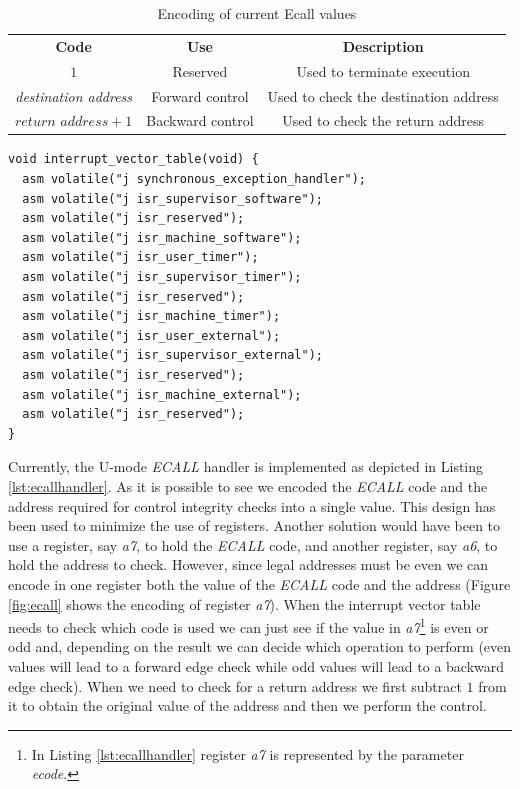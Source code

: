 \begin{table}
  \centering
  \begin{tabular}{|c|c|c|}
    \hline
    \textbf{Code}                & \textbf{Use}     & \textbf{Description}                  \\
    \hhline{===} $1$             & Reserved         & Used to terminate execution           \\
    \hline
    \textit{destination address} & Forward control  & Used to check the destination address \\
    \hline
    $\textit{return address}+ 1$ & Backward control & Used to check the return address      \\
    \hline
  \end{tabular}
  \caption{Encoding of current Ecall values}
  \label{tab:ecalls}
\end{table}

\begin{lstlisting}[style=CStyle, caption = Interrput Vector Table, label={lst:intrtable}]
void interrupt_vector_table(void) {
  asm volatile("j synchronous_exception_handler");
  asm volatile("j isr_supervisor_software");
  asm volatile("j isr_reserved");
  asm volatile("j isr_machine_software");
  asm volatile("j isr_user_timer");
  asm volatile("j isr_supervisor_timer");
  asm volatile("j isr_reserved");
  asm volatile("j isr_machine_timer");
  asm volatile("j isr_user_external");
  asm volatile("j isr_supervisor_external");
  asm volatile("j isr_reserved");
  asm volatile("j isr_machine_external");
  asm volatile("j isr_reserved");
}
\end{lstlisting}

Currently, the U-mode \textit{ECALL} handler is implemented as depicted in
Listing \ref{lst:ecallhandler}. As it is possible to see we encoded the \textit{ECALL}
code and the address required for control integrity checks into a single value. This
design has been used to minimize the use of registers. Another solution would
have been to use a register, say \textit{a7}, to hold the \textit{ECALL} code, and
another register, say \textit{a6}, to hold the address to check. However, since
legal addresses must be even we can encode in one register both the value of the
\textit{ECALL} code and the address (Figure \ref{fig:ecall} shows the encoding
of register \textit{a7}). When the interrupt vector table needs to check which code
is used we can just see if the value in \textit{a7}\footnote{In Listing
\ref{lst:ecallhandler} register \textit{a7} is represented by the parameter \textit{ecode}.}
is even or odd and, depending on the result we can decide which operation to
perform (even values will lead to a forward edge check while odd values will lead
to a backward edge check). When we need to check for a return address we first subtract
$1$ from it to obtain the original value of the address and then we perform the control.

